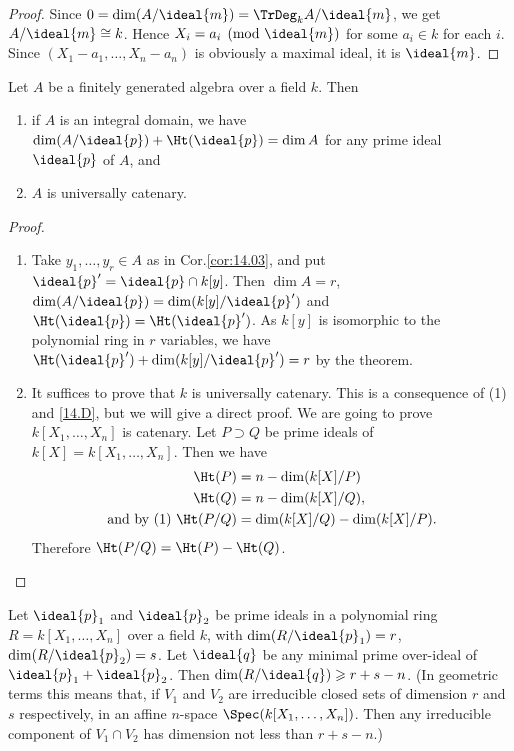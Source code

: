 \documentclass[../main]{subfiles}
\begin{document}
\begin{proof}
Since $0 = \dim(A/\ideal{m}) = \TrDeg_kA/\ideal{m}$, we get $A/\ideal{m}\cong k$. Hence \newline $X_i = a_i\pmod{\ideal{m}}$ for some $a_i\in k$ for each $i$. Since $(X_1-a_1,\ldots,X_n-a_n)$ is obviously a maximal ideal, it is $\ideal{m}$.
\end{proof}

\begin{parcorollary}\label{cor:14.05}
Let $A$ be a finitely generated algebra over a field $k$. Then
\begin{enumerate}[label = (\arabic*)]
    \item if $A$ is an integral domain, we have $\dim(A/\ideal{p}) + \Ht(\ideal{p}) = \dim A$ for any prime ideal $\ideal{p}$ of $A$, and
    \item $A$ is universally catenary.
\end{enumerate}
\end{parcorollary}

\begin{proof}
\begin{enumerate}[label = (\arabic*)]
    \item Take $y_1,\ldots,y_r\in A$ as in Cor.\ref{cor:14.03}, and put $\ideal{p}'=\ideal{p}\cap k[y]$. Then $\dim A =r$, $\dim(A/\ideal{p}) = \dim(k[y]/\ideal{p}')$ and $\Ht(\ideal{p})=\Ht(\ideal{p}')$. As $k[y]$ is isomorphic to the polynomial ring in $r$ variables, we have $\Ht(\ideal{p}') + \dim(k[y]/\ideal{p}') = r$ by the theorem.
    \item It suffices to prove that $k$ is universally catenary. This is a consequence of (1) and \ref{14.D}, but we will give a direct proof. We are going to prove $k[X_1,\ldots,X_n]$ is catenary. Let $P\supset Q$ be prime ideals of $k[X] = k[X_1,\ldots,X_n]$. Then we have
    \begin{align*}
        \Ht(P)&=n-\dim(k[X]/P)\\
        \Ht(Q)&=n-\dim(k[X]/Q),\\
        \text{and by (1) }\Ht(P/Q)&=\dim(k[X]/Q)-\dim(k[X]/P).
    \end{align*}
    Therefore $\Ht(P/Q) = \Ht(P) - \Ht(Q)$.
\end{enumerate}
\end{proof}


\begin{parcorollary}\label{cor:14.06}
Let $\ideal{p}_1$ and $\ideal{p}_2$ be prime ideals in a polynomial ring $R = k[X_1,\ldots,X_n]$ over a field $k$, with $\dim(R/\ideal{p}_1) =r$, $\dim(R/\ideal{p}_2) = s$. Let $\ideal{q}$ be any minimal prime over-ideal of $\ideal{p}_1+\ideal{p}_2$. Then $\dim(R/\ideal{q})\geqslant r +s -n$. (In geometric terms this means that, if $V_1$ and $V_2$ are irreducible closed sets of dimension $r$ and $s$ respectively, in an affine $n$-space $\Spec(k[X_1,\ldots,X_n])$. Then any irreducible component of $V_1\cap V_2$ has dimension not less than $r +s - n$.)
\end{parcorollary}
\end{document}
